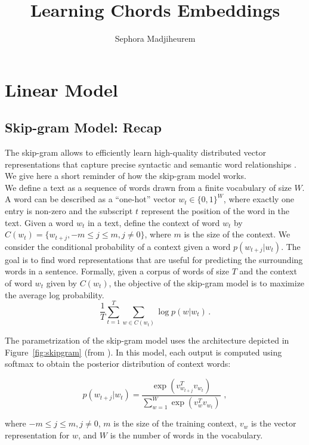 \documentclass[12pt]{article}\pagestyle{myheadings}
\title{Learning Chords Embeddings}
\author{Sephora Madjiheurem}
\begin{document}
\maketitle

\section{Linear Model}
\subsection{Skip-gram Model: Recap}

The skip-gram allows to efficiently learn high-quality distributed vector representations that capture precise syntactic and semantic word relationships \citep{mik2013}. We give here a short reminder of how the skip-gram model works. \\


We define a text as a sequence of words drawn from a finite vocabulary of size $W$. A word can be described as a ``one-hot'' vector $w_t \in \{0,1\}^W$, where exactly one entry is non-zero and the subscript $t$ represent the position of the word in the text.  
Given a  word $w_t$ in a text, define the context of word $w_t$ by $ C(w_t) = \{w_{t+j}, -m \leq j \leq m , j \neq 0\}$, where $m$ is the size of the context. We consider the conditional probability of a context given a word  $p(w_{t+j}|w_t)$.  The goal is to find word representations that are useful for predicting the surrounding words in a sentence. Formally, given a corpus of words of size $T$ and the context of word $w_t$ given by $C(w_t)$, the objective of the skip-gram model is to maximize the average log probability. 
\begin{equation}
\frac{1}{T} \sum_{t=1}^T \sum_{w \in C(w_t)} \log p(w|w_t)\,.
\label{eq:objective}
\end{equation}

The parametrization of the skip-gram model uses the architecture depicted in Figure~\ref{fig:skipgram} (from \citet{mik2013}). In this model, each output is computed using softmax to obtain the posterior distribution of context words:

\begin{equation}
p(w_{t+j}|w_t) = \frac{ \exp (v_{w_{t+j}}^T v_{w_t})}{\sum_{w=1}^W \exp (v_{w}^T v_{w_t})} \,\,,
\end{equation}

where $-m \leq j \leq m, j\neq 0$, $m$ is the size of the training context,  $v_w$ is the vector representation for $w$, and $W$ is the number of words in the vocabulary. \\
\end{document}
